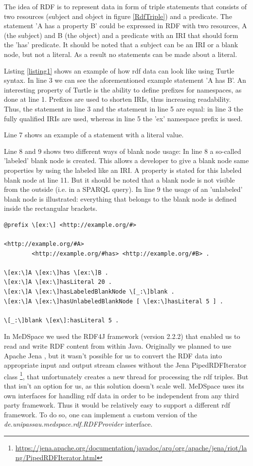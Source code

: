 The idea of RDF is to represent data in form of triple statements that consists of two resources (subject and object in figure \ref{RdfTriple}) and a predicate. The statement 'A has a property B' could be expressed in RDF with two resources, A (the subject) and B (the object) and a predicate with an IRI that should form the 'has' predicate. It should be noted that a subject can be an IRI or a blank node, but not a literal. As a result no statements can be made about a literal.

Listing \ref{listing1} shows an example of how rdf data can look like using Turtle syntax. In line 3 we can see the aforementioned example statement 'A has B'. An interesting property of Turtle is the ability to define prefixes for namespaces, as done at line 1. Prefixes are used to shorten IRIs, thus increasing readability. Thus, the statement in line 3 and the statement in line 5 are equal: in line 3 the fully qualified IRIs are used, whereas in line 5 the 'ex' namespace prefix is used.

Line 7 shows an example of a statement with a literal value.

Line 8 and 9 shows two different ways of blank node usage: In line 8 a so-called 'labeled' blank node is created. This allows a developer to give a blank node same properties by using the labeled like an IRI. A property is stated for this labeled blank node at line 11.
But it should be noted that a blank node is not visible from the outside (i.e. in a SPARQL query).
In line 9 the usage of an 'unlabeled' blank node is illustrated: everything that belongs to the blank node is defined inside the rectangular brackets. \\

\begin{lstlisting}[style=RdfCodeStyle, caption=RDF example data in Turtle syntax, label=listing1]
@prefix \[ex:\] <http://example.org/#>

<http://example.org/#A> 
		<http://example.org/#has> <http://example.org/#B> .

\[ex:\]A \[ex:\]has \[ex:\]B .
\[ex:\]A \[ex:\]hasLiteral 20 .
\[ex:\]A \[ex:\]hasLabeledBlankNode \[_:\]blank .
\[ex:\]A \[ex:\]hasUnlabeledBlankNode [ \[ex:\]hasLiteral 5 ] .

\[_:\]blank \[ex\]:hasLiteral 5 .
\end{lstlisting}


In MeDSpace we used the RDF4J framework (version 2.2.2) \cite{RDF4J} that enabled us to read and write RDF content from within Java. Originally we planned to use Apache Jena \cite{Jena}, but it wasn't possible for us to convert the RDF data into appropriate input and output stream classes without the Jena PipedRDFIterator class \footnote{\url{https://jena.apache.org/documentation/javadoc/arq/org/apache/jena/riot/lang/PipedRDFIterator.html}}, that unfortunately creates a new thread for processing the rdf triples. But that isn't an option for us, as this solution doesn't scale well. 
MeDSpace uses its own interfaces for handling rdf data in order to be independent from any third party framework. Thus it would be relatively easy to support a different rdf framework. To do so, one can implement a custom version of the \emph{de.unipassau.medspace.rdf.RDFProvider} interface. 

